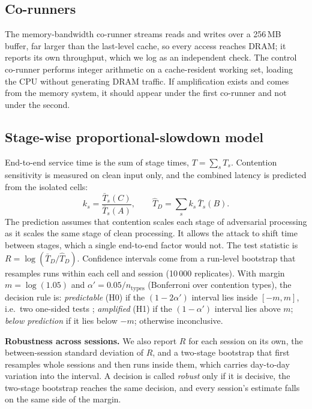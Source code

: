 \documentclass[conference]{IEEEtran}
\begin{document}
\subsection{Co-runners}
The memory-bandwidth co-runner streams reads and writes over a 256\,MB buffer, far larger than
the last-level cache, so every access reaches DRAM; it reports its own throughput, which we log
as an independent check. The control co-runner performs integer arithmetic on a cache-resident
working set, loading the CPU without generating DRAM traffic. If amplification exists and comes
from the memory system, it should appear under the first co-runner and not under the second.

\subsection{Stage-wise proportional-slowdown model}
End-to-end service time is the sum of stage times, $T=\sum_s T_s$. Contention sensitivity is
measured on clean input only, and the combined latency is predicted from the isolated cells:
\begin{equation}
k_s=\frac{\bar T_s(C)}{\bar T_s(A)},\qquad \hat T_D=\sum_s k_s\,\bar T_s(B).
\end{equation}
The prediction assumes that contention scales each stage of adversarial processing as it scales
the same stage of clean processing. It allows the attack to shift time between stages, which a
single end-to-end factor would not. The test statistic is $R=\log(\bar T_D/\hat T_D)$.
Confidence intervals come from a run-level bootstrap \cite{efron1993bootstrap} that resamples runs
within each cell and session (10\,000 replicates). With margin $m=\log(1.05)$ and
$\alpha'=0.05/n_{\text{types}}$ (Bonferroni over contention types), the decision rule is:
\emph{predictable} (H0) if the $(1-2\alpha')$ interval lies inside $[-m,m]$, i.e.\ two one-sided
tests \cite{lakens2017tost}; \emph{amplified} (H1) if the $(1-\alpha')$ interval lies above $m$;
\emph{below prediction} if it lies below $-m$; otherwise inconclusive.

\textbf{Robustness across sessions.} We also report $R$ for each session on its own, the
between-session standard deviation of $R$, and a two-stage bootstrap that first resamples whole
sessions and then runs inside them, which carries day-to-day variation into the interval. A
decision is called \emph{robust} only if it is decisive, the two-stage bootstrap reaches the same
decision, and every session's estimate falls on the same side of the margin.
\end{document}
